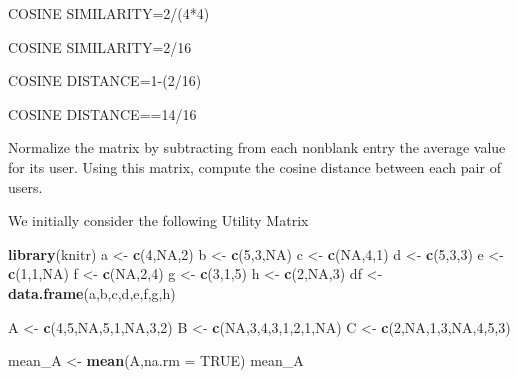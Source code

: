 \documentclass[
]{article}
\newenvironment{Shaded}{\begin{snugshade}}{\end{snugshade}}
\newcommand{\DataTypeTok}[1]{\textcolor[rgb]{0.13,0.29,0.53}{#1}}
\newcommand{\DecValTok}[1]{\textcolor[rgb]{0.00,0.00,0.81}{#1}}
\newcommand{\KeywordTok}[1]{\textcolor[rgb]{0.13,0.29,0.53}{\textbf{#1}}}
\newcommand{\NormalTok}[1]{#1}
\newcommand{\OtherTok}[1]{\textcolor[rgb]{0.56,0.35,0.01}{#1}}
\newcommand{\StringTok}[1]{\textcolor[rgb]{0.31,0.60,0.02}{#1}}
\begin{document}
COSINE SIMILARITY=2/(4*4)

COSINE SIMILARITY=2/16

COSINE DISTANCE=1-(2/16)

COSINE DISTANCE==14/16

Normalize the matrix by subtracting from each nonblank entry the average
value for its user. Using this matrix, compute the cosine distance
between each pair of users.

We initially consider the following Utility Matrix

\begin{Shaded}
\begin{Highlighting}[]
\KeywordTok{library}\NormalTok{(knitr)}
\NormalTok{a <-}\StringTok{ }\KeywordTok{c}\NormalTok{(}\DecValTok{4}\NormalTok{,}\OtherTok{NA}\NormalTok{,}\DecValTok{2}\NormalTok{)}
\NormalTok{b <-}\StringTok{ }\KeywordTok{c}\NormalTok{(}\DecValTok{5}\NormalTok{,}\DecValTok{3}\NormalTok{,}\OtherTok{NA}\NormalTok{)}
\NormalTok{c <-}\StringTok{ }\KeywordTok{c}\NormalTok{(}\OtherTok{NA}\NormalTok{,}\DecValTok{4}\NormalTok{,}\DecValTok{1}\NormalTok{)}
\NormalTok{d <-}\StringTok{ }\KeywordTok{c}\NormalTok{(}\DecValTok{5}\NormalTok{,}\DecValTok{3}\NormalTok{,}\DecValTok{3}\NormalTok{)}
\NormalTok{e <-}\StringTok{ }\KeywordTok{c}\NormalTok{(}\DecValTok{1}\NormalTok{,}\DecValTok{1}\NormalTok{,}\OtherTok{NA}\NormalTok{)}
\NormalTok{f <-}\StringTok{ }\KeywordTok{c}\NormalTok{(}\OtherTok{NA}\NormalTok{,}\DecValTok{2}\NormalTok{,}\DecValTok{4}\NormalTok{)}
\NormalTok{g <-}\StringTok{ }\KeywordTok{c}\NormalTok{(}\DecValTok{3}\NormalTok{,}\DecValTok{1}\NormalTok{,}\DecValTok{5}\NormalTok{)}
\NormalTok{h <-}\StringTok{ }\KeywordTok{c}\NormalTok{(}\DecValTok{2}\NormalTok{,}\OtherTok{NA}\NormalTok{,}\DecValTok{3}\NormalTok{)}
\NormalTok{df <-}\StringTok{ }\KeywordTok{data.frame}\NormalTok{(a,b,c,d,e,f,g,h)}
\end{Highlighting}
\end{Shaded}

\begin{Shaded}
\begin{Highlighting}[]
\NormalTok{A <-}\StringTok{ }\KeywordTok{c}\NormalTok{(}\DecValTok{4}\NormalTok{,}\DecValTok{5}\NormalTok{,}\OtherTok{NA}\NormalTok{,}\DecValTok{5}\NormalTok{,}\DecValTok{1}\NormalTok{,}\OtherTok{NA}\NormalTok{,}\DecValTok{3}\NormalTok{,}\DecValTok{2}\NormalTok{)}
\NormalTok{B <-}\StringTok{ }\KeywordTok{c}\NormalTok{(}\OtherTok{NA}\NormalTok{,}\DecValTok{3}\NormalTok{,}\DecValTok{4}\NormalTok{,}\DecValTok{3}\NormalTok{,}\DecValTok{1}\NormalTok{,}\DecValTok{2}\NormalTok{,}\DecValTok{1}\NormalTok{,}\OtherTok{NA}\NormalTok{)}
\NormalTok{C <-}\StringTok{ }\KeywordTok{c}\NormalTok{(}\DecValTok{2}\NormalTok{,}\OtherTok{NA}\NormalTok{,}\DecValTok{1}\NormalTok{,}\DecValTok{3}\NormalTok{,}\OtherTok{NA}\NormalTok{,}\DecValTok{4}\NormalTok{,}\DecValTok{5}\NormalTok{,}\DecValTok{3}\NormalTok{)}

\NormalTok{mean_A <-}\StringTok{ }\KeywordTok{mean}\NormalTok{(A,}\DataTypeTok{na.rm =} \OtherTok{TRUE}\NormalTok{)}
\NormalTok{mean_A}
\end{Highlighting}
\end{Shaded}
\end{document}

